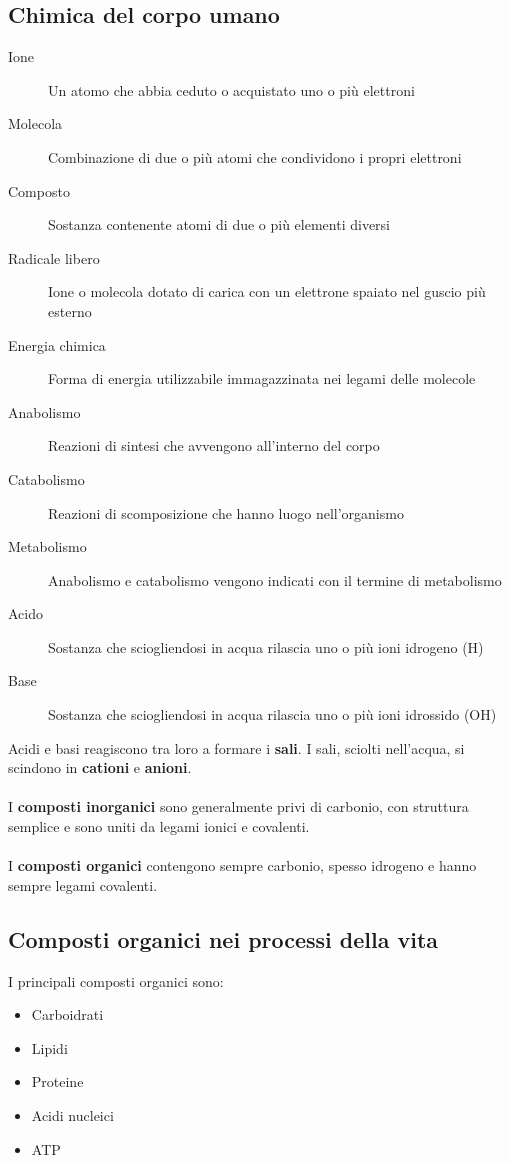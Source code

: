 \documentclass[a4paper]{article}
\begin{document}
\subsection{Chimica del corpo umano}
\begin{description}
\item[Ione] Un atomo che abbia ceduto o acquistato uno o più elettroni
\item[Molecola] Combinazione di due o più atomi che condividono i propri 
elettroni
\item[Composto] Sostanza contenente atomi di due o più elementi diversi
\item[Radicale libero] Ione o molecola dotato di carica con un elettrone 
spaiato nel guscio più esterno
\item[Energia chimica] Forma di energia utilizzabile immagazzinata 
nei legami delle molecole
\item[Anabolismo] Reazioni di sintesi che avvengono all’interno del corpo
\item[Catabolismo] Reazioni di scomposizione che hanno luogo nell’organismo
\item[Metabolismo] Anabolismo e catabolismo vengono indicati con il termine 
di metabolismo
\item[Acido] Sostanza che sciogliendosi in acqua rilascia uno o più ioni 
idrogeno (H)
\item[Base] Sostanza che sciogliendosi in acqua rilascia uno o più ioni 
idrossido (OH)
\end{description}
Acidi e basi reagiscono tra loro a formare i \textbf{sali}. I sali, sciolti 
nell’acqua, si scindono in \textbf{cationi} e \textbf{anioni}. \\ \\
I \textbf{composti inorganici} sono generalmente privi di carbonio, con 
struttura semplice e sono uniti da legami ionici e covalenti. \\ \\
I \textbf{composti organici} contengono sempre carbonio, spesso idrogeno e 
hanno sempre legami covalenti.
\subsection{Composti organici nei processi della vita}
I principali composti organici sono:
\begin{itemize}
\item Carboidrati
\item Lipidi
\item Proteine
\item Acidi nucleici
\item ATP
\end{itemize}
\end{document}
